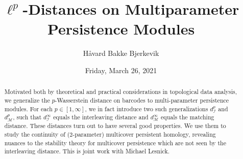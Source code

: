 \documentclass{UAmathtalk}
\author{H\r{a}vard Bakke Bjerkevik}
\title{$\ell^p$-Distances on Multiparameter Persistence Modules}
\date{Friday, March 26, 2021}
\begin{document}
\maketitle

%

\begin{abstract}
Motivated both by theoretical and practical considerations in topological data analysis, we generalize the $p$-Wasserstein distance on barcodes to multi-parameter persistence modules.  For each $p\in [1,\infty]$, we in fact introduce two such generalizations $d_{\mathcal I}^p$ and $d_{\mathcal M}^p$, such that $d_{\mathcal I}^\infty$ equals the interleaving distance and $d_{\mathcal M}^\infty$ equals the matching distance.  These distances turn out to have several good properties.  We use them to study the continuity of (2-parameter) multicover persistent homology, revealing nuances to the stability theory for multicover persistence which are not seen by the interleaving distance.  This is joint work with Michael Lesnick.
\end{abstract}
\end{document}
